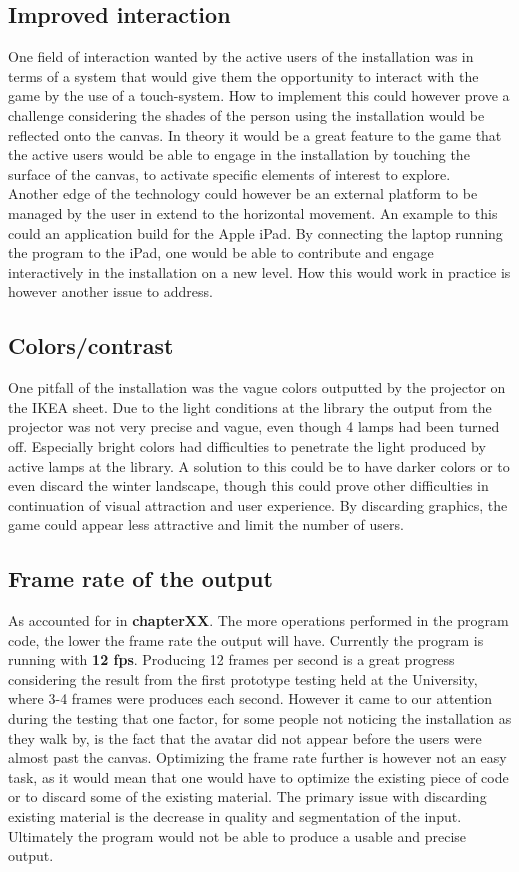 \subsection{Improved interaction}
One field of interaction wanted by the active users of the installation was in terms of a system that would give them the opportunity to interact with the game by the use of a touch-system. How to implement this could however prove a challenge considering the shades of the person using the installation would be reflected onto the canvas. In theory it would be a great feature to the game that the active users would be able to engage in the installation by touching the surface of the canvas, to activate specific elements of interest to explore.\\
Another edge of the technology could however be an external platform to be managed by the user in extend to the horizontal movement. An example to this could an application build for the Apple iPad. By connecting the laptop running the program to the iPad, one would be able to contribute and engage interactively in the installation on a new level. How this would work in practice is however another issue to address. 
\subsection{Colors/contrast}
One pitfall of the installation was the vague colors outputted by the projector on the IKEA sheet. Due to the light conditions at the library the output from the projector was not very precise and vague, even though 4 lamps had been turned off. Especially bright colors had difficulties to penetrate the light produced by active lamps at the library. A solution to this could be to have darker colors or to even discard the winter landscape, though this could prove other difficulties in continuation of visual attraction and user experience. By discarding graphics, the game could appear less attractive and limit the number of users.
 
\subsection{Frame rate of the output}
As accounted for in \textbf{chapterXX}. The more operations performed in the program code, the lower the frame rate the output will have. Currently the program is running with \textbf{12 fps}. Producing 12 frames per second is a great progress considering the result from the first prototype testing held at the University, where 3-4 frames were produces each second. However it came to our attention during the testing that one factor, for some people not noticing the installation as they walk by, is the fact that the avatar did not appear before the users were almost past the canvas. Optimizing the frame rate further is however not an easy task, as it would mean that one would have to optimize the existing piece of code or to discard some of the existing material. The primary issue with discarding existing material is the decrease in quality and segmentation of the input. Ultimately the program would not be able to produce a usable and precise output.   
